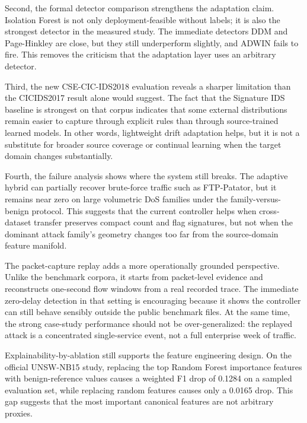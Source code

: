 \documentclass[conference]{IEEEtran}
\begin{document}
Second, the formal detector comparison strengthens the adaptation claim. Isolation Forest is not only deployment-feasible without labels; it is also the strongest detector in the measured study. The immediate detectors DDM and Page-Hinkley are close, but they still underperform slightly, and ADWIN fails to fire. This removes the criticism that the adaptation layer uses an arbitrary detector.

Third, the new CSE-CIC-IDS2018 evaluation reveals a sharper limitation than the CICIDS2017 result alone would suggest. The fact that the Signature IDS baseline is strongest on that corpus indicates that some external distributions remain easier to capture through explicit rules than through source-trained learned models. In other words, lightweight drift adaptation helps, but it is not a substitute for broader source coverage or continual learning when the target domain changes substantially.

Fourth, the failure analysis shows where the system still breaks. The adaptive hybrid can partially recover brute-force traffic such as FTP-Patator, but it remains near zero on large volumetric DoS families under the family-versus-benign protocol. This suggests that the current controller helps when cross-dataset transfer preserves compact count and flag signatures, but not when the dominant attack family's geometry changes too far from the source-domain feature manifold.

The packet-capture replay adds a more operationally grounded perspective. Unlike the benchmark corpora, it starts from packet-level evidence and reconstructs one-second flow windows from a real recorded trace. The immediate zero-delay detection in that setting is encouraging because it shows the controller can still behave sensibly outside the public benchmark files. At the same time, the strong case-study performance should not be over-generalized: the replayed attack is a concentrated single-service event, not a full enterprise week of traffic.

Explainability-by-ablation still supports the feature engineering design. On the official UNSW-NB15 study, replacing the top Random Forest importance features with benign-reference values causes a weighted F1 drop of 0.1284 on a sampled evaluation set, while replacing random features causes only a 0.0165 drop. This gap suggests that the most important canonical features are not arbitrary proxies.
\end{document}
